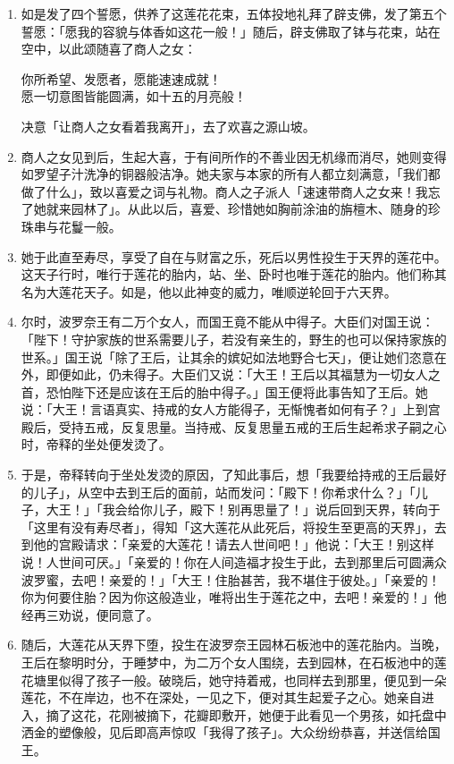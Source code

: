 \begin{enumerate}
\item 如是发了四个誓愿，供养了这莲花花束，五体投地礼拜了辟支佛，发了第五个誓愿：「愿我的容貌与体香如这花一般！」随后，辟支佛取了钵与花束，站在空中，以此颂随喜了商人之女：\begin{quoting}你所希望、发愿者，愿能速速成就！\\愿一切意图皆能圆满，如十五的月亮般！\end{quoting}决意「让商人之女看着我离开」，去了欢喜之源山坡。
\item 商人之女见到后，生起大喜，于有间所作的不善业因无机缘而消尽，她则变得如罗望子汁洗净的铜器般洁净。她夫家与本家的所有人都立刻满意，「我们都做了什么」，致以喜爱之词与礼物。商人之子派人「速速带商人之女来！我忘了她就来园林了」。从此以后，喜爱、珍惜她如胸前涂油的旃檀木、随身的珍珠串与花鬘一般。
\item 她于此直至寿尽，享受了自在与财富之乐，死后以男性投生于天界的莲花中。这天子行时，唯行于莲花的胎内，站、坐、卧时也唯于莲花的胎内。他们称其名为大莲花天子。如是，他以此神变的威力，唯顺逆轮回于六天界。
\item 尔时，波罗奈王有二万个女人，而国王竟不能从中得子。大臣们对国王说：「陛下！守护家族的世系需要儿子，若没有亲生的，野生的也可以保持家族的世系。」国王说「除了王后，让其余的嫔妃如法地野合七天」，便让她们恣意在外，即便如此，仍未得子。大臣们又说：「大王！王后以其福慧为一切女人之首，恐怕陛下还是应该在王后的胎中得子。」国王便将此事告知了王后。她说：「大王！言语真实、持戒的女人方能得子，无惭愧者如何有子？」上到宫殿后，受持五戒，反复思量。当持戒、反复思量五戒的王后生起希求子嗣之心时，帝释的坐处便发烫了。
\item 于是，帝释转向于坐处发烫的原因，了知此事后，想「我要给持戒的王后最好的儿子」，从空中去到王后的面前，站而发问：「殿下！你希求什么？」「儿子，大王！」「我会给你儿子，殿下！别再思量了！」说后回到天界，转向于「这里有没有寿尽者」，得知「这大莲花从此死后，将投生至更高的天界」，去到他的宫殿请求：「亲爱的大莲花！请去人世间吧！」他说：「大王！别这样说！人世间可厌。」「亲爱的！你在人间造福才投生于此，去到那里后可圆满众波罗蜜，去吧！亲爱的！」「大王！住胎甚苦，我不堪住于彼处。」「亲爱的！你为何要住胎？因为你这般造业，唯将出生于莲花之中，去吧！亲爱的！」他经再三劝说，便同意了。
\item 随后，大莲花从天界下堕，投生在波罗奈王园林石板池中的莲花胎内。当晚，王后在黎明时分，于睡梦中，为二万个女人围绕，去到园林，在石板池中的莲花塘里似得了孩子一般。破晓后，她守持着戒，也同样去到那里，便见到一朵莲花，不在岸边，也不在深处，一见之下，便对其生起爱子之心。她亲自进入，摘了这花，花刚被摘下，花瓣即敷开，她便于此看见一个男孩，如托盘中洒金的塑像般，见后即高声惊叹「我得了孩子」。大众纷纷恭喜，并送信给国王。

\end{enumerate}
